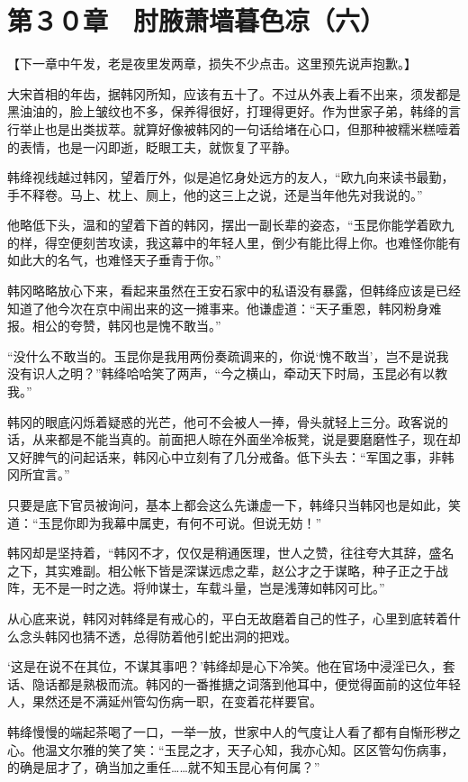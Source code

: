 \section{第３０章　肘腋萧墙暮色凉（六）}

【下一章中午发，老是夜里发两章，损失不少点击。这里预先说声抱歉。】

大宋首相的年齿，据韩冈所知，应该有五十了。不过从外表上看不出来，须发都是黑油油的，脸上皱纹也不多，保养得很好，打理得更好。作为世家子弟，韩绛的言行举止也是出类拔萃。就算好像被韩冈的一句话给堵在心口，但那种被糯米糕噎着的表情，也是一闪即逝，眨眼工夫，就恢复了平静。

韩绛视线越过韩冈，望着厅外，似是追忆身处远方的友人，“欧九向来读书最勤，手不释卷。马上、枕上、厕上，他的这三上之说，还是当年他先对我说的。”

他略低下头，温和的望着下首的韩冈，摆出一副长辈的姿态，“玉昆你能学着欧九的样，得空便刻苦攻读，我这幕中的年轻人里，倒少有能比得上你。也难怪你能有如此大的名气，也难怪天子垂青于你。”

韩冈略略放心下来，看起来虽然在王安石家中的私语没有暴露，但韩绛应该是已经知道了他今次在京中闹出来的这一摊事来。他谦虚道：“天子重恩，韩冈粉身难报。相公的夸赞，韩冈也是愧不敢当。”

“没什么不敢当的。玉昆你是我用两份奏疏调来的，你说‘愧不敢当’，岂不是说我没有识人之明？”韩绛哈哈笑了两声，“今之横山，牵动天下时局，玉昆必有以教我。”

韩冈的眼底闪烁着疑惑的光芒，他可不会被人一捧，骨头就轻上三分。政客说的话，从来都是不能当真的。前面把人晾在外面坐冷板凳，说是要磨磨性子，现在却又好脾气的问起话来，韩冈心中立刻有了几分戒备。低下头去：“军国之事，非韩冈所宜言。”

只要是底下官员被询问，基本上都会这么先谦虚一下，韩绛只当韩冈也是如此，笑道：“玉昆你即为我幕中属吏，有何不可说。但说无妨！”

韩冈却是坚持着，“韩冈不才，仅仅是稍通医理，世人之赞，往往夸大其辞，盛名之下，其实难副。相公帐下皆是深谋远虑之辈，赵公才之于谋略，种子正之于战阵，无不是一时之选。将帅谋士，车载斗量，岂是浅薄如韩冈可比。”

从心底来说，韩冈对韩绛是有戒心的，平白无故磨着自己的性子，心里到底转着什么念头韩冈也猜不透，总得防着他引蛇出洞的把戏。

‘这是在说不在其位，不谋其事吧？’韩绛却是心下冷笑。他在官场中浸淫已久，套话、隐话都是熟极而流。韩冈的一番推搪之词落到他耳中，便觉得面前的这位年轻人，果然还是不满延州管勾伤病一职，在变着花样要官。

韩绛慢慢的端起茶喝了一口，一举一放，世家中人的气度让人看了都有自惭形秽之心。他温文尔雅的笑了笑：“玉昆之才，天子心知，我亦心知。区区管勾伤病事，的确是屈才了，确当加之重任……就不知玉昆心有何属？”


